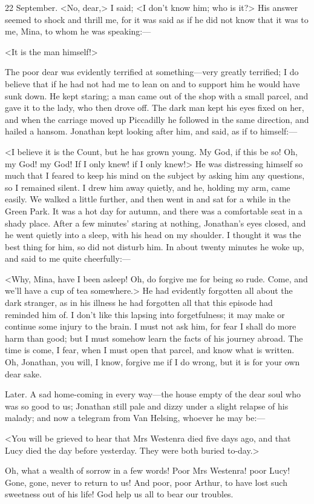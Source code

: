 \begin{diary}{22 September.}
<No, dear,> I said; <I don't know him; who is it?> His answer seemed to shock and thrill me, for it was said as if he did not know that it was to me, Mina, to whom he was speaking:—

<It is the man himself!>

The poor dear was evidently terrified at something—very greatly terrified; I do believe that if he had not had me to lean on and to support him he would have sunk down. He kept staring; a man came out of the shop with a small parcel, and gave it to the lady, who then drove off. The dark man kept his eyes fixed on her, and when the carriage moved up Piccadilly he followed in the same direction, and hailed a hansom. Jonathan kept looking after him, and said, as if to himself:—

<I believe it is the Count, but he has grown young. My God, if this be so! Oh, my God! my God! If I only knew! if I only knew!> He was distressing himself so much that I feared to keep his mind on the subject by asking him any questions, so I remained silent. I drew him away quietly, and he, holding my arm, came easily. We walked a little further, and then went in and sat for a while in the Green Park. It was a hot day for autumn, and there was a comfortable seat in a shady place. After a few minutes' staring at nothing, Jonathan's eyes closed, and he went quietly into a sleep, with his head on my shoulder. I thought it was the best thing for him, so did not disturb him. In about twenty minutes he woke up, and said to me quite cheerfully:—

<Why, Mina, have I been asleep! Oh, do forgive me for being so rude. Come, and we'll have a cup of tea somewhere.> He had evidently forgotten all about the dark stranger, as in his illness he had forgotten all that this episode had reminded him of. I don't like this lapsing into forgetfulness; it may make or continue some injury to the brain. I must not ask him, for fear I shall do more harm than good; but I must somehow learn the facts of his journey abroad. The time is come, I fear, when I must open that parcel, and know what is written. Oh, Jonathan, you will, I know, forgive me if I do wrong, but it is for your own dear sake.
\end{diary}
 

\begin{diary}{Later.}
A sad home-coming in every way—the house empty of the dear soul who was so good to us; Jonathan still pale and dizzy under a slight relapse of his malady; and now a telegram from Van Helsing, whoever he may be:—

<You will be grieved to hear that Mrs Westenra died five days ago, and that Lucy died the day before yesterday. They were both buried to-day.>

Oh, what a wealth of sorrow in a few words! Poor Mrs Westenra! poor Lucy! Gone, gone, never to return to us! And poor, poor Arthur, to have lost such sweetness out of his life! God help us all to bear our troubles.
\end{diary}

